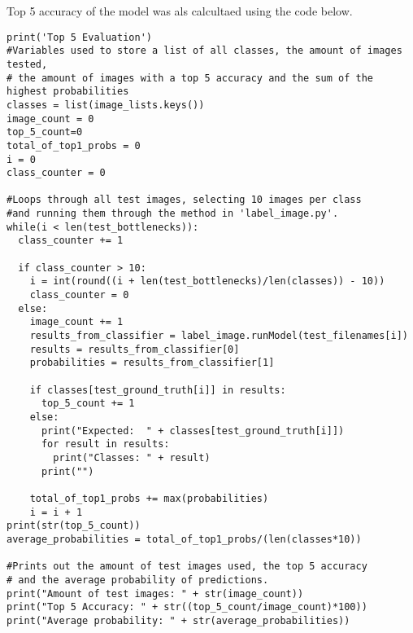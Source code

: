 Top 5 accuracy of the model was als calcultaed using the code below.
\begin{lstlisting}[style=Python]
print('Top 5 Evaluation')
#Variables used to store a list of all classes, the amount of images tested,
# the amount of images with a top 5 accuracy and the sum of the highest probabilities
classes = list(image_lists.keys())
image_count = 0
top_5_count=0
total_of_top1_probs = 0
i = 0 
class_counter = 0

#Loops through all test images, selecting 10 images per class 
#and running them through the method in 'label_image.py'.
while(i < len(test_bottlenecks)):
  class_counter += 1
  
  if class_counter > 10:
    i = int(round((i + len(test_bottlenecks)/len(classes)) - 10))
    class_counter = 0
  else:
    image_count += 1
    results_from_classifier = label_image.runModel(test_filenames[i])
    results = results_from_classifier[0]
    probabilities = results_from_classifier[1]

    if classes[test_ground_truth[i]] in results:
      top_5_count += 1
    else:
      print("Expected:  " + classes[test_ground_truth[i]])
      for result in results:
        print("Classes: " + result)
      print("")

    total_of_top1_probs += max(probabilities)
    i = i + 1
print(str(top_5_count))
average_probabilities = total_of_top1_probs/(len(classes*10))

#Prints out the amount of test images used, the top 5 accuracy
# and the average probability of predictions.
print("Amount of test images: " + str(image_count))
print("Top 5 Accuracy: " + str((top_5_count/image_count)*100))
print("Average probability: " + str(average_probabilities))
\end{lstlisting}


